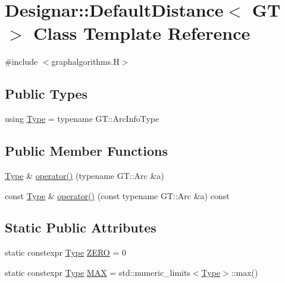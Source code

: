\hypertarget{class_designar_1_1_default_distance}{}\section{Designar\+:\+:Default\+Distance$<$ GT $>$ Class Template Reference}
\label{class_designar_1_1_default_distance}


{\ttfamily \#include $<$graphalgorithms.\+H$>$}

\subsection*{Public Types}
\begin{DoxyCompactItemize}
\item 
using \hyperlink{class_designar_1_1_default_distance_a9317a5edf566779550b96edd532b502b}{Type} = typename G\+T\+::\+Arc\+Info\+Type
\end{DoxyCompactItemize}
\subsection*{Public Member Functions}
\begin{DoxyCompactItemize}
\item 
\hyperlink{class_designar_1_1_default_distance_a9317a5edf566779550b96edd532b502b}{Type} \& \hyperlink{class_designar_1_1_default_distance_ac601666aabb51229c4ceff72cd7d82db}{operator()} (typename G\+T\+::\+Arc \&a)
\item 
const \hyperlink{class_designar_1_1_default_distance_a9317a5edf566779550b96edd532b502b}{Type} \& \hyperlink{class_designar_1_1_default_distance_aeba8bd2867faf7d86dd0bcae6b690136}{operator()} (const typename G\+T\+::\+Arc \&a) const
\end{DoxyCompactItemize}
\subsection*{Static Public Attributes}
\begin{DoxyCompactItemize}
\item 
static constexpr \hyperlink{class_designar_1_1_default_distance_a9317a5edf566779550b96edd532b502b}{Type} \hyperlink{class_designar_1_1_default_distance_abee3d9a2a3f573d6844c0a0fdbd4d7ac}{Z\+E\+RO} = 0
\item 
static constexpr \hyperlink{class_designar_1_1_default_distance_a9317a5edf566779550b96edd532b502b}{Type} \hyperlink{class_designar_1_1_default_distance_af1c417705ee2d66f828c0f872607a7ea}{M\+AX} = std\+::numeric\+\_\+limits$<$\hyperlink{class_designar_1_1_default_distance_a9317a5edf566779550b96edd532b502b}{Type}$>$\+::max()
\end{DoxyCompactItemize}


